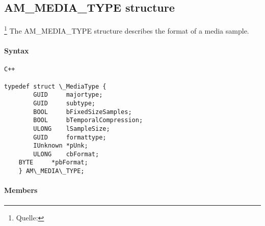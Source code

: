 \subsection{AM\_MEDIA\_TYPE structure}\footnote{Quelle:\cite{504}}
The AM\_MEDIA\_TYPE structure describes the format of a media sample.
\paragraph{Syntax}
\begin{verbatim}
C++

typedef struct \_MediaType {
        GUID     majortype;
        GUID     subtype;
        BOOL     bFixedSizeSamples;
        BOOL     bTemporalCompression;
        ULONG    lSampleSize;
        GUID     formattype;
        IUnknown *pUnk;
        ULONG    cbFormat;
    BYTE     *pbFormat;
    } AM\_MEDIA\_TYPE;
\end{verbatim}
\paragraph{Members}

